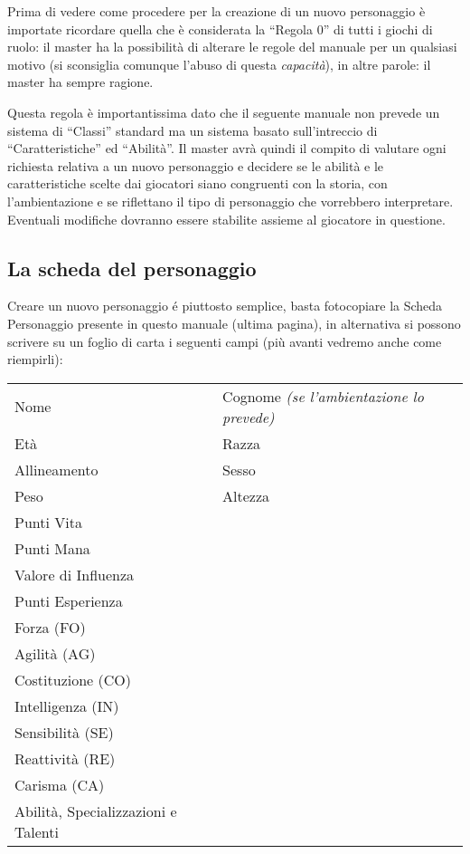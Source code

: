 \documentclass[../manuale_main.tex]{subfiles}
\begin{document}
Prima di vedere come procedere per la creazione di un nuovo personaggio è importate ricordare quella che è considerata la ``Regola 0'' di tutti i giochi di ruolo: il master ha la possibilità di alterare le regole del manuale per un qualsiasi motivo (si sconsiglia comunque l'abuso di questa \textit{capacità}), in altre parole: il master ha sempre ragione.

Questa regola è importantissima dato che il seguente manuale non prevede un sistema di ``Classi'' standard ma un sistema basato sull'intreccio di ``Caratteristiche'' ed ``Abilità''. 
Il master avrà quindi il compito di valutare ogni richiesta relativa a  un nuovo personaggio e decidere se le abilità e le caratteristiche scelte dai giocatori siano congruenti con la storia, con l'ambientazione e se riflettano il tipo di personaggio che vorrebbero interpretare. Eventuali modifiche dovranno essere stabilite assieme al giocatore in questione.
\subsection{La scheda del personaggio}
Creare un nuovo personaggio é piuttosto semplice, basta fotocopiare la Scheda Personaggio presente in questo manuale (ultima pagina), in alternativa si possono scrivere su un foglio di carta i seguenti campi (più avanti vedremo anche come riempirli):\\
\begin{center}
\renewcommand{\arraystretch}{1.2}
\begin{tabular}{ l l }
Nome & Cognome \textit{(se l'ambientazione lo prevede)} \\
Età  & Razza \\
Allineamento & Sesso \\
Peso & Altezza \\

Punti Vita &\\
Punti Mana &\\
Valore di Influenza &\\
Punti Esperienza &\\

Forza (FO) &\\
Agilità (AG) &\\
Costituzione (CO) &\\
Intelligenza (IN) &\\
Sensibilità (SE) &\\
Reattività (RE) &\\
Carisma (CA) &\\

Abilità, Specializzazioni e Talenti &\\
\end{tabular}
\end{center}
\end{document}

